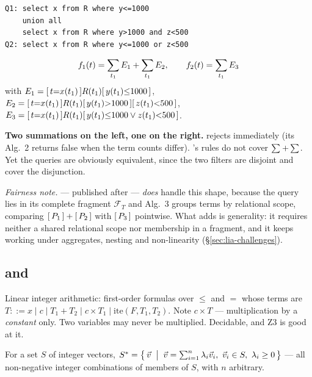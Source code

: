 \begin{example}
\label{ex:splitunion}
\begin{lstlisting}[style=sql]
Q1: select x from R where y<=1000
    union all
    select x from R where y>1000 and z<500
Q2: select x from R where y<=1000 or z<500
\end{lstlisting}
\[
f_1(t)=\sum_{t_1}E_1+\sum_{t_1}E_2, \qquad f_2(t)=\sum_{t_1}E_3
\]
with $E_1=[\,t{=}x(t_1)\,]R(t_1)[\,y(t_1){\le}1000\,]$,
$E_2=[\,t{=}x(t_1)\,]R(t_1)[\,y(t_1){>}1000\,][\,z(t_1){<}500\,]$,
$E_3=[\,t{=}x(t_1)\,]R(t_1)[\,y(t_1){\le}1000\vee z(t_1){<}500\,]$.

\textbf{Two summations on the left, one on the right.} \udp{} rejects immediately (its
Alg.~2 returns false when the term counts differ). \wetune{}'s rules do not cover
$\sum_{}+\sum_{}$. Yet the queries are obviously equivalent, since the two filters are
disjoint and cover the disjunction.

\emph{Fairness note.} \QED{} --- published after \sqlsolver{} --- \emph{does} handle this
shape, because the query lies in its complete fragment $\mathcal F_T$ and Alg.~3 groups
terms by relational scope, comparing $[\,P_1\,]+[\,P_2\,]$ with $[\,P_3\,]$ pointwise. What
\liastar{} adds is generality: it requires neither a shared relational scope nor membership
in a fragment, and it keeps working under aggregates, nesting and non-linearity
(\S\ref{sec:lia-challenges}).
\end{example}

\subsection{\lia{} and \liastar{}}

\begin{definition}[\lia{}]
Linear integer arithmetic: first-order formulas over $\le$ and $=$ whose terms are
$T ::= x \mid c \mid T_1+T_2 \mid c\times T_1 \mid \mathrm{ite}(F,T_1,T_2)$.
Note $c\times T$ --- multiplication by a \emph{constant} only. Two variables may never be
multiplied. Decidable, and Z3 is good at it.
\end{definition}

\begin{definition}
For a set $S$ of integer vectors,
$S^* = \bigl\{\,\vec v \;\bigm|\; \vec v=\sum_{i=1}^{n}\lambda_i \vec v_i,\ \vec v_i\in S,\ \lambda_i\ge0 \,\bigr\}$
--- all non-negative integer combinations of members of $S$, with $n$ arbitrary.
\end{definition}

